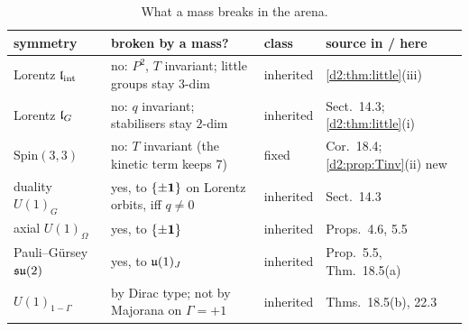 \begin{table}[t]
\centering
\small
\begin{tabular}{@{}l>{\raggedright\arraybackslash}p{5.6cm}l>{\raggedright\arraybackslash}p{3.7cm}@{}}
\toprule
symmetry & broken by a mass? & class & source in \cite{ES17} / here\\
\midrule
Lorentz $\mathfrak l_{\rm int}$ & no: $P^2$, $T$ invariant; little groups stay $3$-dim & inherited & \cref{d2:thm:little}(iii)\\
Lorentz $\mathfrak l_G$ & no: $q$ invariant; stabilisers stay $2$-dim & inherited & Sect.~14.3; \cref{d2:thm:little}(i)\\
$\mathrm{Spin}(3,3)$ & no: $T$ invariant (the kinetic term keeps $7$) & fixed & Cor.~18.4; \cref{d2:prop:Tinv}(ii) new\\
duality $U(1)_G$ & yes, to $\{\pm\mathbf 1\}$ on Lorentz orbits, iff $q\neq0$ & inherited & Sect.~14.3\\
axial $U(1)_\Omega$ & yes, to $\{\pm\mathbf 1\}$ & inherited & Props.~4.6, 5.5\\
Pauli--G\"ursey $\mathfrak{su}(2)$ & yes, to $\mathfrak{u}(1)_J$ & inherited & Prop.~5.5, Thm.~18.5(a)\\
$U(1)_{1-\Gamma}$ & by Dirac type; not by Majorana on $\Gamma=+1$ & inherited & Thms.~18.5(b), 22.3\\
\bottomrule
\end{tabular}
\caption{What a mass breaks in the arena.}
\label{d2:tab:verdict}
\end{table}

